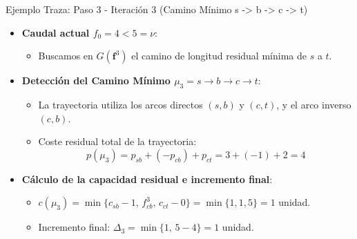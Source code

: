 \documentclass[
  ignorenonframetext,
]{beamer}
\providecommand{\tightlist}{%
  \setlength{\itemsep}{0pt}\setlength{\parskip}{0pt}}
\begin{document}
\begin{frame}{Ejemplo Traza: Paso 3 - Iteración 3 (Camino Mínimo s
-\textgreater{} b -\textgreater{} c -\textgreater{} t)}
\label{ejemplo-traza-paso-3---iteraciuxf3n-3-camino-muxednimo-s---b---c---t}
\begin{itemize}
\tightlist
\item
  \textbf{Caudal actual \(f_0 = 4 < 5 = \nu\)}:

  \begin{itemize}
  \tightlist
  \item
    Buscamos en \(G(\mathbf{f}^3)\) el camino de longitud residual
    mínima de \(s\) a \(t\).
  \end{itemize}
\item
  \textbf{Detección del Camino Mínimo \(\mu_3 = s \to b \to c \to t\)}:

  \begin{itemize}
  \tightlist
  \item
    La trayectoria utiliza los arcos directos \((s,b)\) y \((c,t)\), y
    el arco inverso \((c,b)\).
  \item
    Coste residual total de la trayectoria:
    \[p(\mu_3) = p_{sb} + (-p_{cb}) + p_{ct} = 3 + (-1) + 2 = 4\]
  \end{itemize}
\item
  \textbf{Cálculo de la capacidad residual e incremento final}:

  \begin{itemize}
  \tightlist
  \item
    \(c(\mu_3) = \min \{ c_{sb}-1, \, f_{cb}^3, \, c_{ct}-0 \} = \min \{1, 1, 5\} = 1\)
    unidad.
  \item
    Incremento final: \(\Delta_3 = \min \{1, \, 5 - 4\} = 1\) unidad.
  \end{itemize}
\end{itemize}
\end{frame}
\end{document}
